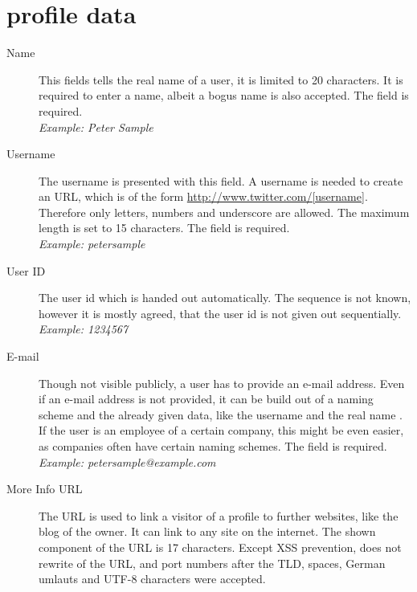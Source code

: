 \chapter{\Twitter{} profile data}
\label{chap:twitter_profile_data}

\begin{description}
\item[Name] This fields tells the real name of a user, it is limited to 20
            characters. It is required to enter a name, albeit a bogus name is
            also accepted. The field is required.\\
            \textit{Example: Peter Sample}
\item[Username] The username is presented with this field. A username is needed
                to create an URL, which is of the form \url{http://www.twitter.com/[username]}.
                Therefore only letters, numbers and underscore are allowed. The maximum length
                is set to 15 characters. The field is required.\\
                \textit{Example: petersample}
\item[User ID] The user id which is handed out automatically. The sequence is
               not known, however it is mostly agreed, that the user id is not given out
               sequentially.\\
               \textit{Example: 1234567}
\item[E-mail] Though not visible publicly, a \Twitter{} user has to provide an
              e-mail address. Even if an e-mail address is not provided, it
              can be build out of a naming scheme and the already
              given data, like the username and the real name \cite{brown2008}. If the user
              is an employee of a certain company, this might be even easier,
              as companies often have certain naming schemes. The field is required.\\
              \textit{Example: petersample@example.com}
\item[More Info URL] The URL is used to link a visitor of a profile to further
                     websites, like the blog of the owner. It can link to
                     any site on the internet. The shown component of the
                     URL is 17 characters. Except XSS prevention,
                     \Twitter{} does not rewrite of the URL, and port numbers
                     after the TLD, spaces, German umlauts and UTF-8 characters were
                     accepted.\\

\end{description}
